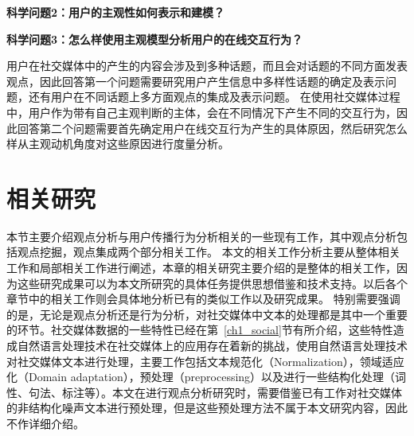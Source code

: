 \textbf{科学问题2：用户的主观性如何表示和建模？}

\textbf{科学问题3：怎么样使用主观模型分析用户的在线交互行为？}

用户在社交媒体中的产生的内容会涉及到多种话题，而且会对话题的不同方面发表观点，因此回答第一个问题需要研究用户产生信息中多样性话题的确定及表示问题，还有用户在不同话题上多方面观点的集成及表示问题。
在使用社交媒体过程中，用户作为带有自己主观判断的主体，会在不同情况下产生不同的交互行为，因此回答第二个问题需要首先确定用户在线交互行为产生的具体原因，然后研究怎么样从主观动机角度对这些原因进行度量分析。

\section{相关研究}
本节主要介绍观点分析与用户传播行为分析相关的一些现有工作，其中观点分析包括观点挖掘，观点集成两个部分相关工作。
本文的相关工作分析主要从整体相关工作和局部相关工作进行阐述，本章的相关研究主要介绍的是整体的相关工作，因为这些研究成果可以为本文所研究的具体任务提供思想借鉴和技术支持。以后各个章节中的相关工作则会具体地分析已有的类似工作以及研究成果。
特别需要强调的是，无论是观点分析还是行为分析，对社交媒体中文本的处理都是其中一个重要的环节。社交媒体数据的一些特性已经在第~\ref{ch1_social}节有所介绍，这些特性造成自然语言处理技术在社交媒体上的应用存在着新的挑战，使用自然语言处理技术对社交媒体文本进行处理，主要工作包括文本规范化（Normalization），领域适应化（Domain adaptation），预处理（preprocessing）以及进行一些结构化处理（词性、句法、标注等）。本文在进行观点分析研究时，需要借鉴已有工作对社交媒体的非结构化噪声文本进行预处理，但是这些预处理方法不属于本文研究内容，因此不作详细介绍。

